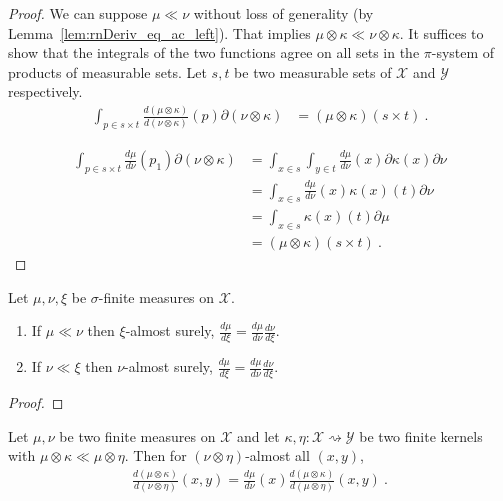 \begin{proof}\mathlibok
{}
We can suppose $\mu \ll \nu$ without loss of generality (by Lemma~\ref{lem:rnDeriv_eq_ac_left}).
That implies $\mu \otimes \kappa \ll \nu \otimes \kappa$.
It suffices to show that the integrals of the two functions agree on all sets in the $\pi$-system of products of measurable sets. Let $s, t$ be two measurable sets of $\mathcal X$ and $\mathcal Y$ respectively.
\begin{align*}
\int_{p \in s \times t} \frac{d (\mu \otimes \kappa)}{d (\nu \otimes \kappa)}(p) \partial(\nu \otimes \kappa)
&= (\mu \otimes \kappa) (s \times t)
\: .
\end{align*}

\begin{align*}
\int_{p \in s \times t} \frac{d \mu}{d \nu}(p_1) \partial(\nu \otimes \kappa)
&= \int_{x \in s} \int_{y \in t} \frac{d \mu}{d \nu}(x) \partial \kappa(x) \partial \nu
\\
&= \int_{x \in s} \frac{d \mu}{d \nu}(x) \kappa(x)(t) \partial \nu
\\
&= \int_{x \in s} \kappa(x)(t) \partial \mu
\\
&= (\mu \otimes \kappa) (s \times t)
\: .
\end{align*}
\end{proof}


\begin{lemma}
  \label{lem:rnDeriv_chain}
  \mathlibok
  \uses{}
  Let $\mu, \nu, \xi$ be $\sigma$-finite measures on $\mathcal X$.
  \begin{enumerate}
    \item If $\mu \ll \nu$ then $\xi$-almost surely, $\frac{d \mu}{d \xi} = \frac{d \mu}{d \nu} \frac{d \nu}{d \xi}$.
    \item If $\nu \ll \xi$ then $\nu$-almost surely, $\frac{d \mu}{d \xi} = \frac{d \mu}{d \nu} \frac{d \nu}{d \xi}$.
  \end{enumerate}
\end{lemma}

\begin{proof}\mathlibok
\uses{}
\end{proof}


\begin{theorem}
  \label{thm:rnDeriv_chain_compProd}
  \mathlibok
  \uses{}
  Let $\mu, \nu$ be two finite measures on $\mathcal X$ and let $\kappa, \eta : \mathcal X \rightsquigarrow \mathcal Y$ be two finite kernels with $\mu \otimes \kappa \ll \mu \otimes \eta$. Then for $(\nu \otimes \eta)$-almost all $(x,y)$,
  \begin{align*}
  \frac{d(\mu \otimes \kappa)}{d(\nu \otimes \eta)}(x, y)
  = \frac{d \mu}{d \nu}(x) \frac{d(\mu \otimes \kappa)}{d(\mu \otimes \eta)}(x, y)
  \: .
  \end{align*}
\end{theorem}

